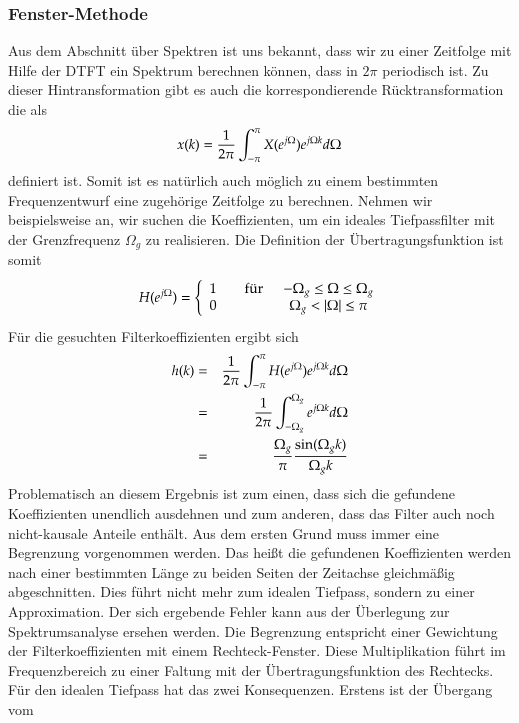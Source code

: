 \subsubsection{Fenster-Methode}
Aus dem Abschnitt über Spektren ist uns bekannt, dass wir zu einer Zeitfolge mit Hilfe der
DTFT ein Spektrum berechnen können, dass in $2\pi$ periodisch ist. Zu dieser Hintransformation gibt es
auch die korrespondierende Rücktransformation die als
\begin{equation}\label{FIR:IDTFT:Def}
    x(k) = \frac{1}{2\pi}\int_{-\pi}^{\pi} X\jom e^{j\Omega k} d\Omega
\end{equation}
definiert ist. Somit ist es natürlich auch möglich zu einem bestimmten Frequenzentwurf
eine zugehörige Zeitfolge zu berechnen.
Nehmen wir beispielsweise an, wir suchen die Koeffizienten, um ein ideales Tiefpassfilter mit der
Grenzfrequenz $\Omega_g$ zu realisieren. Die Definition der Übertragungsfunktion ist somit
\begin{equation}\label{FIR:BSP:Tiefpass}
    H\jom = \Bigg\{ \begin{array}{lcc}
1 & \fuer & -\Omega_g \leq \Omega \leq  \Omega_g\\
0 & & \Omega_g < |\Omega| \leq \pi
\end{array}
\end{equation}
Für die gesuchten Filterkoeffizienten ergibt sich
\begin{eqnarray}\label{FIR:TP:Ideal}
    h(k) & = &\frac{1}{2\pi}\int_{-\pi}^{\pi} H\jom e^{j\Omega k} d\Omega\\
         & = &\frac{1}{2\pi}\int_{-\Omega_g}^{\Omega_g}e^{j\Omega k} d\Omega\\
         & = &\frac{\Omega_g}{\pi} \frac{\sin(\Omega_g k)}{\Omega_g k}
\end{eqnarray}
Problematisch an diesem Ergebnis ist zum einen, dass sich die gefundene Koeffizienten
unendlich ausdehnen und zum anderen, dass das Filter auch noch nicht-kausale Anteile
enthält.
Aus dem ersten Grund muss immer eine Begrenzung vorgenommen werden. Das heißt die
gefundenen Koeffizienten werden nach einer
bestimmten Länge zu beiden Seiten der Zeitachse gleichmäßig abgeschnitten.
Dies führt nicht mehr zum idealen Tiefpass, sondern zu einer Approximation. Der sich
ergebende Fehler kann aus der Überlegung zur Spektrumsanalyse ersehen werden. Die Begrenzung
entspricht einer Gewichtung der Filterkoeffizienten mit einem Rechteck-Fenster.
Diese Multiplikation führt im Frequenzbereich zu einer Faltung mit der Übertragungsfunktion
des Rechtecks. Für den idealen Tiefpass hat das zwei Konsequenzen. Erstens ist der Übergang vom
